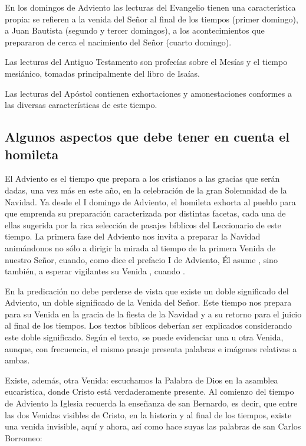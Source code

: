 \begin{introstyle}
	En los domingos de Adviento las lecturas\label{fn4} del Evangelio tienen una característica propia: se refieren a la venida del Señor al final de los tiempos (primer domingo), a Juan Bautista (segundo y tercer domingos), a los acontecimientos que prepararon de cerca el nacimiento del Señor (cuarto domingo).
	
	Las lecturas del Antiguo Testamento son profecías sobre el Mesías y el tiempo mesiánico, tomadas principalmente del libro de Isaías.
	
	Las lecturas del Apóstol contienen exhortaciones y amonestaciones conformes a las diversas características de este tiempo.
	
	\subsection{Algunos aspectos que debe tener en cuenta el homileta}
	
	El Adviento es el tiempo que prepara a los cristianos a las gracias que serán dadas, una vez más en este año, en la celebración de la gran Solemnidad de la Navidad. Ya desde el I domingo de Adviento, el homileta exhorta al pueblo para que emprenda su preparación caracterizada por distintas facetas, cada una de ellas sugerida por la rica selección de pasajes bíblicos del Leccionario de este tiempo. La primera fase del Adviento nos invita a preparar la Navidad animándonos no sólo a dirigir la mirada al tiempo de la primera Venida de nuestro Señor, cuando, como dice el prefacio I de Adviento, Él asume , sino también, a esperar vigilantes su Venida , cuando \label{fn5}.
	
	En la predicación no debe perderse de vista que existe un doble significado del Adviento, un doble significado de la Venida del Señor. Este tiempo nos prepara para su Venida en la gracia de la fiesta de la Navidad y a su retorno para el juicio al final de los tiempos. Los textos bíblicos deberían ser explicados considerando este doble significado. Según el texto, se puede evidenciar una u otra Venida, aunque, con frecuencia, el mismo pasaje presenta palabras e imágenes relativas a ambas.
	
	Existe, además, otra Venida: escuchamos la Palabra de Dios en la asamblea eucarística, donde Cristo está verdaderamente presente. Al comienzo del tiempo de Adviento la Iglesia recuerda la enseñanza de san Bernardo, es decir, que entre las dos Venidas visibles de Cristo, en la historia y al final de los tiempos, existe una venida invisible, aquí y ahora\label{fn6}, así como hace suyas las palabras de san Carlos Borromeo:
	

\end{introstyle}
